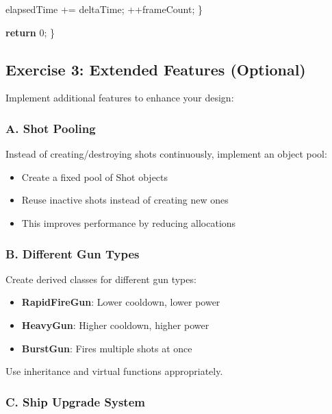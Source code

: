 \documentclass[
]{article}
\newenvironment{Shaded}{\begin{snugshade}}{\end{snugshade}}
\newcommand{\ControlFlowTok}[1]{\textcolor[rgb]{0.00,0.23,0.31}{\textbf{#1}}}
\newcommand{\DecValTok}[1]{\textcolor[rgb]{0.68,0.00,0.00}{#1}}
\newcommand{\NormalTok}[1]{\textcolor[rgb]{0.00,0.23,0.31}{#1}}
\newcommand{\OperatorTok}[1]{\textcolor[rgb]{0.37,0.37,0.37}{#1}}
\providecommand{\tightlist}{%
  \setlength{\itemsep}{0pt}\setlength{\parskip}{0pt}}
\begin{document}
\begin{Shaded}
\begin{Highlighting}[]
\NormalTok{        elapsedTime }\OperatorTok{+=}\NormalTok{ deltaTime}\OperatorTok{;}
        \OperatorTok{++}\NormalTok{frameCount}\OperatorTok{;}
    \OperatorTok{\}}
    
    \ControlFlowTok{return} \DecValTok{0}\OperatorTok{;}
\OperatorTok{\}}
\end{Highlighting}
\end{Shaded}

\subsection{Exercise 3: Extended Features
(Optional)}\label{exercise-3-extended-features-optional}

Implement additional features to enhance your design:

\subsubsection{A. Shot Pooling}\label{a.-shot-pooling}

Instead of creating/destroying shots continuously, implement an object
pool:

\begin{itemize}
\tightlist
\item
  Create a fixed pool of Shot objects
\item
  Reuse inactive shots instead of creating new ones
\item
  This improves performance by reducing allocations
\end{itemize}

\subsubsection{B. Different Gun Types}\label{b.-different-gun-types}

Create derived classes for different gun types:

\begin{itemize}
\tightlist
\item
  \textbf{RapidFireGun}: Lower cooldown, lower power
\item
  \textbf{HeavyGun}: Higher cooldown, higher power
\item
  \textbf{BurstGun}: Fires multiple shots at once
\end{itemize}

Use inheritance and virtual functions appropriately.

\subsubsection{C. Ship Upgrade System}\label{c.-ship-upgrade-system}
\end{document}
